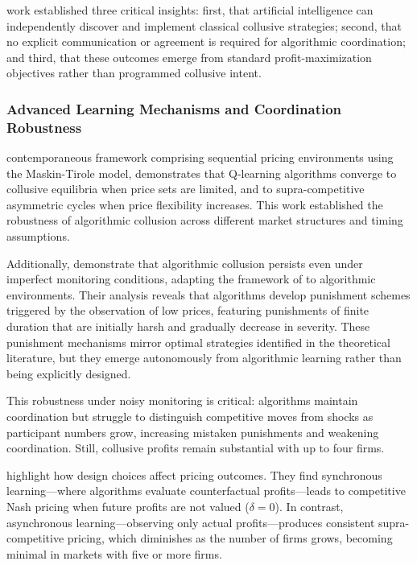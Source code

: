 \textcite{calvano_artificial_2020} work established three critical insights: first, that artificial intelligence can independently discover and implement classical collusive strategies; second, that no explicit communication or agreement is required for algorithmic coordination; and third, that these outcomes emerge from standard profit-maximization objectives rather than programmed collusive intent.

\subsubsection*{Advanced Learning Mechanisms and Coordination Robustness}

\textcite{klein_autonomous_2021} contemporaneous framework comprising sequential pricing environments using the Maskin-Tirole model, demonstrates that Q-learning algorithms converge to collusive equilibria when price sets are limited, and to supra-competitive asymmetric cycles when price flexibility increases. This work established the robustness of algorithmic collusion across different market structures and timing assumptions.

Additionally, \textcite{calvano_algorithmic_2021} demonstrate that algorithmic collusion persists even under imperfect monitoring conditions, adapting the framework of \textcite{green_noncooperative_1984} to algorithmic environments. Their analysis reveals that algorithms develop punishment schemes triggered by the observation of low prices, featuring punishments of finite duration that are initially harsh and gradually decrease in severity. These punishment mechanisms mirror optimal strategies identified in the theoretical literature, but they emerge autonomously from algorithmic learning rather than being explicitly designed.

This robustness under noisy monitoring is critical: algorithms maintain coordination but struggle to distinguish competitive moves from shocks as participant numbers grow, increasing mistaken punishments and weakening coordination. Still, collusive profits remain substantial with up to four firms.

\textcite{asker_artificial_2022, asker_impact_2024} highlight how design choices affect pricing outcomes. They find synchronous learning—where algorithms evaluate counterfactual profits—leads to competitive Nash pricing when future profits are not valued ($\delta=0$). In contrast, asynchronous learning—observing only actual profits—produces consistent supra-competitive pricing, which diminishes as the number of firms grows, becoming minimal in markets with five or more firms.

